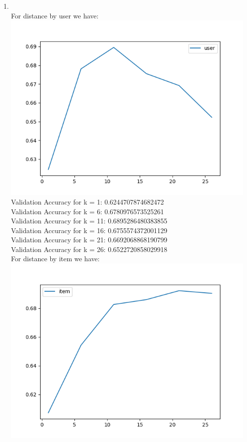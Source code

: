 \documentclass{article}
\begin{document}
\begin{enumerate}[label=\alph*]
    \item ${}$\\
    For distance by user we have: \\
    \includegraphics[scale=0.50]{../figs/knn_user.png}\\
    Validation Accuracy for k = 1: 0.6244707874682472\\
    Validation Accuracy for k = 6: 0.6780976573525261\\
    Validation Accuracy for k = 11: 0.6895286480383855\\
    Validation Accuracy for k = 16: 0.6755574372001129\\
    Validation Accuracy for k = 21: 0.6692068868190799\\
    Validation Accuracy for k = 26: 0.6522720858029918\\
    For distance by item we have: \\
    \includegraphics[scale=0.50]{../figs/knn_item.png}\\

\end{enumerate}
\end{document}
